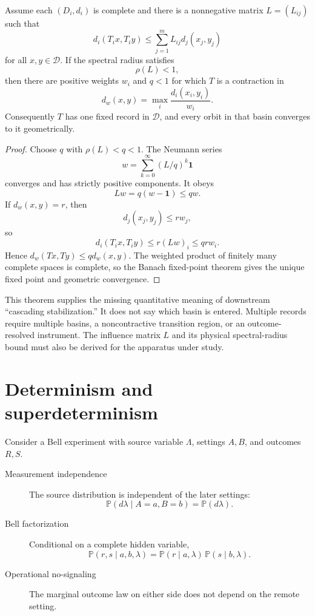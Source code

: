 \documentclass[11pt]{article}
\newcommand{\bbP}{\mathbb P}
\begin{document}
\begin{theorem}
\label{thm:coupled}
Assume each \((D_i,d_i)\) is complete and there is a nonnegative matrix
\(L=(L_{ij})\) such that
\[
d_i(T_i x,T_i y)
\leq
\sum_{j=1}^m L_{ij}d_j(x_j,y_j)
\]
for all \(x,y\in\mathcal D\). If the spectral radius satisfies
\[
\rho(L)<1,
\]
then there are positive weights \(w_i\) and \(q<1\) for which \(T\) is a
contraction in
\[
d_w(x,y)
=\max_i\frac{d_i(x_i,y_i)}{w_i}.
\]
Consequently \(T\) has one fixed record in \(\mathcal D\), and every orbit in
that basin converges to it geometrically.
\end{theorem}

\begin{proof}
Choose \(q\) with \(\rho(L)<q<1\). The Neumann series
\[
w=
\sum_{k=0}^{\infty}(L/q)^k\mathbf 1
\]
converges and has strictly positive components. It obeys
\[
Lw=q(w-\mathbf 1)\leq qw.
\]
If \(d_w(x,y)=r\), then
\[
d_j(x_j,y_j)\leq r w_j,
\]
so
\[
d_i(T_i x,T_i y)
\leq r(Lw)_i
\leq qrw_i.
\]
Hence \(d_w(Tx,Ty)\leq qd_w(x,y)\). The weighted product of finitely many
complete spaces is complete, so the Banach fixed-point theorem gives the
unique fixed point and geometric convergence.
\end{proof}

This theorem supplies the missing quantitative meaning of downstream
``cascading stabilization.'' It does not say which basin is entered. Multiple
records require multiple basins, a noncontractive transition region, or an
outcome-resolved instrument. The influence matrix \(L\) and its physical
spectral-radius bound must also be derived for the apparatus under study.

\section{Determinism and superdeterminism}

Consider a Bell experiment with source variable \(\Lambda\), settings
\(A,B\), and outcomes \(R,S\).

\begin{description}
\item[Measurement independence] The source distribution is independent of
the later settings:
\[
\bbP(d\lambda\mid A=a,B=b)=\bbP(d\lambda).
\]
\item[Bell factorization] Conditional on a complete hidden variable,
\[
\bbP(r,s\mid a,b,\lambda)
=
\bbP(r\mid a,\lambda)\,
\bbP(s\mid b,\lambda).
\]
\item[Operational no-signaling] The marginal outcome law on either side does
not depend on the remote setting.
\end{description}
\end{document}
